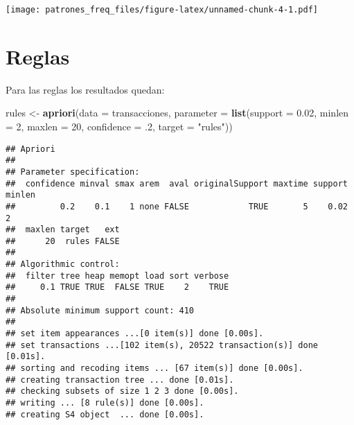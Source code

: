\documentclass[]{article}
\newenvironment{Shaded}{\begin{snugshade}}{\end{snugshade}}
\newcommand{\KeywordTok}[1]{\textcolor[rgb]{0.13,0.29,0.53}{\textbf{#1}}}
\newcommand{\DataTypeTok}[1]{\textcolor[rgb]{0.13,0.29,0.53}{#1}}
\newcommand{\DecValTok}[1]{\textcolor[rgb]{0.00,0.00,0.81}{#1}}
\newcommand{\FloatTok}[1]{\textcolor[rgb]{0.00,0.00,0.81}{#1}}
\newcommand{\StringTok}[1]{\textcolor[rgb]{0.31,0.60,0.02}{#1}}
\newcommand{\OperatorTok}[1]{\textcolor[rgb]{0.81,0.36,0.00}{\textbf{#1}}}
\newcommand{\NormalTok}[1]{#1}
\begin{document}
\begin{Shaded}
\end{Shaded}

\texttt{[image: patrones\_freq\_files/figure-latex/unnamed-chunk-4-1.pdf]}

\section{Reglas}\label{reglas}

Para las reglas los resultados quedan:

\begin{Shaded}
\begin{Highlighting}[]
\NormalTok{rules <-}\StringTok{ }\KeywordTok{apriori}\NormalTok{(}\DataTypeTok{data =}\NormalTok{ transacciones,}
                    \DataTypeTok{parameter =} \KeywordTok{list}\NormalTok{(}\DataTypeTok{support =} \FloatTok{0.02}\NormalTok{,}
                                     \DataTypeTok{minlen =} \DecValTok{2}\NormalTok{,}
                                     \DataTypeTok{maxlen =} \DecValTok{20}\NormalTok{,}
                                     \DataTypeTok{confidence =}\NormalTok{ .}\DecValTok{2}\NormalTok{,}
                                     \DataTypeTok{target =} \StringTok{"rules"}\NormalTok{))}
\end{Highlighting}
\end{Shaded}

\begin{verbatim}
## Apriori
## 
## Parameter specification:
##  confidence minval smax arem  aval originalSupport maxtime support minlen
##         0.2    0.1    1 none FALSE            TRUE       5    0.02      2
##  maxlen target   ext
##      20  rules FALSE
## 
## Algorithmic control:
##  filter tree heap memopt load sort verbose
##     0.1 TRUE TRUE  FALSE TRUE    2    TRUE
## 
## Absolute minimum support count: 410 
## 
## set item appearances ...[0 item(s)] done [0.00s].
## set transactions ...[102 item(s), 20522 transaction(s)] done [0.01s].
## sorting and recoding items ... [67 item(s)] done [0.00s].
## creating transaction tree ... done [0.01s].
## checking subsets of size 1 2 3 done [0.00s].
## writing ... [8 rule(s)] done [0.00s].
## creating S4 object  ... done [0.00s].
\end{verbatim}
\end{document}
